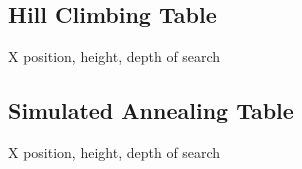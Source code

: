 \documentclass{article}
\begin{document}
\subsection{Hill Climbing Table}
X position, height, depth of search

\subsection{Simulated Annealing Table}
X position, height, depth of search
\end{document}

